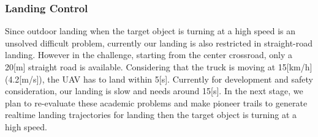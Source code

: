 \documentclass{standalone}
\begin{document}
\subsubsection{Landing Control}
Since outdoor landing when the target object is turning at a high speed is an unsolved difficult problem, currently our landing is also restricted in straight-road landing. However in the challenge, starting from the center crossroad, only a 20[m] straight road is available. Considering that the truck is moving at 15[km/h] (4.2[m/s]), the UAV has to land within 5[s]. Currently for development and safety consideration, our landing is slow and needs around 15[s].
In the next stage, we plan to re-evaluate these academic problems and make pioneer trails to generate realtime landing trajectories for landing then the target object is turning at a high speed.
\end{document}
